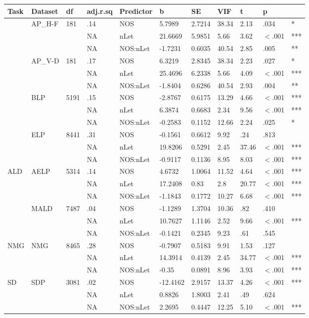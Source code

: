 \begin{table}[ht]
\centering
\begingroup\normalsize
\begin{tabular}{lllllllllll}
  \hline
Task & Dataset & df & adj.r.sq & Predictor & b & SE & VIF & t & p &  \\ 
  \hline
 & AP\_H-F & 181 & .14 & NOS & 5.7989 & 2.7214 & 38.34 & 2.13 & .034 & * \\ 
   &  &  & NA & nLet & 21.6669 & 5.9851 & 5.66 & 3.62 & $<$.001 & *** \\ 
   &  &  & NA & NOS:nLet & -1.7231 & 0.6035 & 40.54 & 2.85 & .005 & ** \\ 
   & AP\_V-D & 181 & .17 & NOS & 6.3219 & 2.8345 & 38.34 & 2.23 & .027 & * \\ 
   &  &  & NA & nLet & 25.4696 & 6.2338 & 5.66 & 4.09 & $<$.001 & *** \\ 
   &  &  & NA & NOS:nLet & -1.8404 & 0.6286 & 40.54 & 2.93 & .004 & ** \\ 
   & BLP & 5191 & .15 & NOS & -2.8767 & 0.6175 & 13.29 & 4.66 & $<$.001 & *** \\ 
   &  &  & NA & nLet & 6.3874 & 0.6683 & 2.34 & 9.56 & $<$.001 & *** \\ 
   &  &  & NA & NOS:nLet & -0.2583 & 0.1152 & 12.66 & 2.24 & .025 & * \\ 
   & ELP & 8441 & .31 & NOS & -0.1561 & 0.6612 & 9.92 & .24 & .813 &   \\ 
   &  &  & NA & nLet & 19.8206 & 0.5291 & 2.45 & 37.46 & $<$.001 & *** \\ 
   &  &  & NA & NOS:nLet & -0.9117 & 0.1136 & 8.95 & 8.03 & $<$.001 & *** \\ 
  ALD & AELP & 5314 & .14 & NOS & 4.6732 & 1.0064 & 11.52 & 4.64 & $<$.001 & *** \\ 
   &  &  & NA & nLet & 17.2408 & 0.83 & 2.8 & 20.77 & $<$.001 & *** \\ 
   &  &  & NA & NOS:nLet & -1.1843 & 0.1772 & 10.27 & 6.68 & $<$.001 & *** \\ 
   & MALD & 7487 & .04 & NOS & -1.1289 & 1.3704 & 10.36 & .82 & .410 &   \\ 
   &  &  & NA & nLet & 10.7627 & 1.1146 & 2.52 & 9.66 & $<$.001 & *** \\ 
   &  &  & NA & NOS:nLet & -0.1421 & 0.2345 & 9.23 & .61 & .545 &   \\ 
  NMG & NMG & 8465 & .28 & NOS & -0.7907 & 0.5183 & 9.91 & 1.53 & .127 &   \\ 
   &  &  & NA & nLet & 14.3914 & 0.4139 & 2.45 & 34.77 & $<$.001 & *** \\ 
   &  &  & NA & NOS:nLet & -0.35 & 0.0891 & 8.96 & 3.93 & $<$.001 & *** \\ 
  SD & SDP & 3081 & .02 & NOS & -12.4162 & 2.9157 & 13.37 & 4.26 & $<$.001 & *** \\ 
   &  &  & NA & nLet & 0.8826 & 1.8003 & 2.41 & .49 & .624 &   \\ 
   &  &  & NA & NOS:nLet & 2.2695 & 0.4447 & 12.25 & 5.10 & $<$.001 & *** \\ 
   \hline
\end{tabular}
\endgroup
\end{table}
